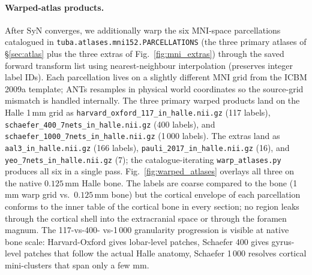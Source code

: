 \documentclass{compactarticle}
\begin{document}
\paragraph{Warped-atlas products.}
After SyN converges, we additionally warp the six MNI-space
parcellations catalogued in
\texttt{tuba.atlases.mni152.PARCELLATIONS} (the three primary atlases
of \S\ref{sec:atlas} plus the three extras of
Fig.~\ref{fig:mni_extras}) through the saved forward transform list
using nearest-neighbour interpolation (preserves integer label IDs).
Each parcellation lives on a slightly different MNI grid from the
ICBM 2009a template; ANTs resamples in physical world coordinates so
the source-grid mismatch is handled internally. The three primary
warped products land on the Halle 1\,mm grid as
\texttt{harvard\_oxford\_117\_in\_halle.nii.gz} (117 labels),
\texttt{schaefer\_400\_7nets\_in\_halle.nii.gz} (400 labels), and
\texttt{schaefer\_1000\_7nets\_in\_halle.nii.gz} (1\,000 labels). The
extras land as \texttt{aal3\_in\_halle.nii.gz} (166 labels),
\texttt{pauli\_2017\_in\_halle.nii.gz} (16), and
\texttt{yeo\_7nets\_in\_halle.nii.gz} (7); the catalogue-iterating
\texttt{warp\_atlases.py} produces all six in a single pass.
Fig.~\ref{fig:warped_atlases} overlays all three on the native
$0.125$\,mm Halle bone. The labels are coarse compared to the bone
(1\,mm warp grid vs.\ $0.125$\,mm bone) but the cortical envelope of
each parcellation conforms to the inner table of the cortical bone in
every section; no region leaks through the cortical shell into the
extracranial space or through the foramen magnum. The 117-vs-400-
vs-1\,000 granularity progression is visible at native bone scale:
Harvard-Oxford gives lobar-level patches, Schaefer 400 gives
gyrus-level patches that follow the actual Halle anatomy, Schaefer
1\,000 resolves cortical mini-clusters that span only a few mm.
\end{document}
